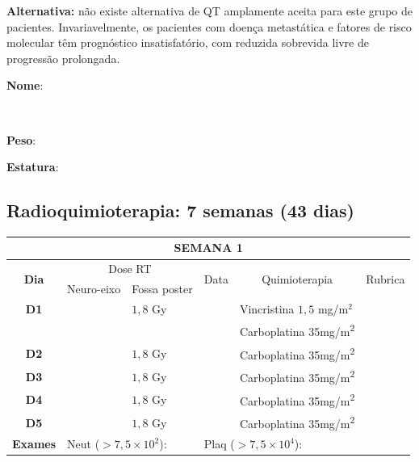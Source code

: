 \documentclass[11pt,a4paper,oldfontcommands]{memoir}
\def\entrywithlabel[#1]#2{\parbox{#1}{{\small #2:} \hrulefill}}
\begin{document}
\textbf{Alternativa:} não existe alternativa de QT amplamente aceita para este grupo de pacientes. Invariavelmente, os pacientes com doença metastática e fatores de risco molecular têm prognóstico insatisfatório, com reduzida sobrevida livre de progressão prolongada.
\\[0.4cm]
\entrywithlabel[1\hsize]{\textbf{Nome}}\hfill
\\[0.3cm]
\entrywithlabel[.45\hsize]{\textbf{Peso}}\hfill  \entrywithlabel[.45\hsize]{\textbf{Estatura}}

\subsection{Radioquimioterapia: 7 semanas (43 dias)}

\begin{center}
\begin{table}[H]
\begin{tabular}{p{1cm}p{2cm}|p{2cm}|p{1cm}|p{4cm}|p{3cm}}
	\hline
	\multicolumn{6}{c}{\textbf{SEMANA 1}}\\
\hline
    \multicolumn{1}{c|}{\multirow{2}{*}{\textbf{Dia}}}&\multicolumn{2}{c|}{Dose RT}&\multicolumn{1}{c|}{\multirow{2}{*}{Data}}&\multicolumn{1}{c|}{\multirow{2}{*}{Quimioterapia}}&\multicolumn{1}{c}{\multirow{2}{*}{Rubrica}} \\
    \cline{2-3}
    \multicolumn{1}{c|}{\multirow{1}{*}{}}&{Neuro-eixo}&{Fossa poster}&& \\
	\hline
	\multicolumn{1}{c|}{\multirow{1}{*}{\textbf{D1}}}&\multicolumn{1}{c|}{}&{\(1,8\) Gy}&&{Vincristina \(1,5\) mg/m\(^2\)}&\\
	\multicolumn{1}{c|}{\multirow{1}{*}{\textbf{}}}&\multicolumn{1}{c|}{}&&&{Carboplatina 35mg/m\textsuperscript{2}}&\\
    \multicolumn{1}{c|}{\multirow{1}{*}{\textbf{D2}}}&\multicolumn{1}{c|}{}&{\(1,8\) Gy}&&{Carboplatina 35mg/m\textsuperscript{2}}&\\
    \multicolumn{1}{c|}{\multirow{1}{*}{\textbf{D3}}}&\multicolumn{1}{c|}{}&{\(1,8\) Gy}&&{Carboplatina 35mg/m\textsuperscript{2}}&\\
    \multicolumn{1}{c|}{\multirow{1}{*}{\textbf{D4}}}&\multicolumn{1}{c|}{}&{\(1,8\) Gy}&&{Carboplatina 35mg/m\textsuperscript{2}}&\\
    \multicolumn{1}{c|}{\multirow{1}{*}{\textbf{D5}}}&\multicolumn{1}{c|}{}&{\(1,8\) Gy}&&{Carboplatina 35mg/m\textsuperscript{2}}&\\
    \hline
    \multicolumn{1}{c|}{\multirow{2}{*}{\textbf{Exames}}}&\multicolumn{2}{l|}{Neut (\(>7,5\times10^2\)):}&\multicolumn{2}{l|}{Plaq (\(>7,5\times10^4\)):}&\\

\end{tabular}
\end{table}
\end{center}
\end{document}
